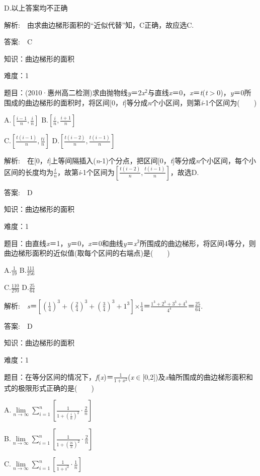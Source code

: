 \documentclass{article} %
\begin{document}
D.以上答案均不正确

 解析:　由求曲边梯形面积的``近似代替''知，C正确，故应选C.

 答案:　C

 知识：曲边梯形的面积

 难度：1

 题目：(2010·惠州高二检测)求由抛物线\textit{y}＝2\textit{x}${}^{2}$与直线\textit{x}＝0，\textit{x}＝\textit{t}(\textit{t}$\mathrm{>}$0)，\textit{y}＝0所围成的曲边梯形的面积时，将区间[0，\textit{t}]等分成\textit{n}个小区间，则第\textit{i}-1个区间为(　　)

A.$[\frac{i-1}{n}, \frac{i}{n}]$     B.$[\frac{i}{n}, \frac{i+1}{n}]$

C.$[\frac{t(i-1)}{n}, \frac{ti}{n}]$      D.$[\frac{t(i-2)}{n}, \frac{t(i-1)}{n}]$

 解析:　在[0，\textit{t}]上等间隔插入(\textit{n}-1)个分点，把区间[0，\textit{t}]等分成\textit{n}个小区间，每个小区间的长度均为$\frac{t}{n}$，故第\textit{i}-1个区间为$[\frac{t(i-2)}{n}, \frac{t(i-1)}{n}]$，故选D.

 答案:　D



 知识：曲边梯形的面积

 难度：1

 题目：由直线\textit{x}＝1，\textit{y}＝0，\textit{x}＝0和曲线\textit{y}＝\textit{x}${}^{3}$所围成的曲边梯形，将区间4等分，则曲边梯形面积的近似值(取每个区间的右端点)是(　　)

A.$\frac{1}{19}$        B.$\frac{111}{256}$  

C.$\frac{110}{270}$        D.$\frac{25}{64}$

 解析:　\textit{s}＝$[(\frac{1}{4})^3+(\frac{2}{4})^3+(\frac{3}{4})^3+1^3]\mathrm{\times}\frac{1}{4}$＝$\frac{1^3+2^3+3^3+4^3}{4^4}$＝$\frac{25}{64}$.

 答案:　D



 知识：曲边梯形的面积

 难度：1

 题目：在等分区间的情况下，\textit{f}(\textit{x})＝$\frac{1}{1+x^2}$(\textit{x}$\mathrm{\in}$[0,2])及\textit{x}轴所围成的曲边梯形面积和式的极限形式正确的是(　　)

A.$\lim\limits_{n\rightarrow \infty}\sum\limits_{i=1}^n[\frac{1}{1+(\frac{i}{n})^2}\cdot\frac{2}{n}]$

B.$\lim\limits_{n\rightarrow \infty}\sum\limits_{i=1}^n[\frac{1}{1+(\frac{2i}{n})^2}\cdot\frac{2}{n}]$

C.$\lim\limits_{n\rightarrow \infty}\sum\limits_{i=1}^n[\frac{1}{1+i^2}\cdot\frac{1}{n}]$
\end{document}
